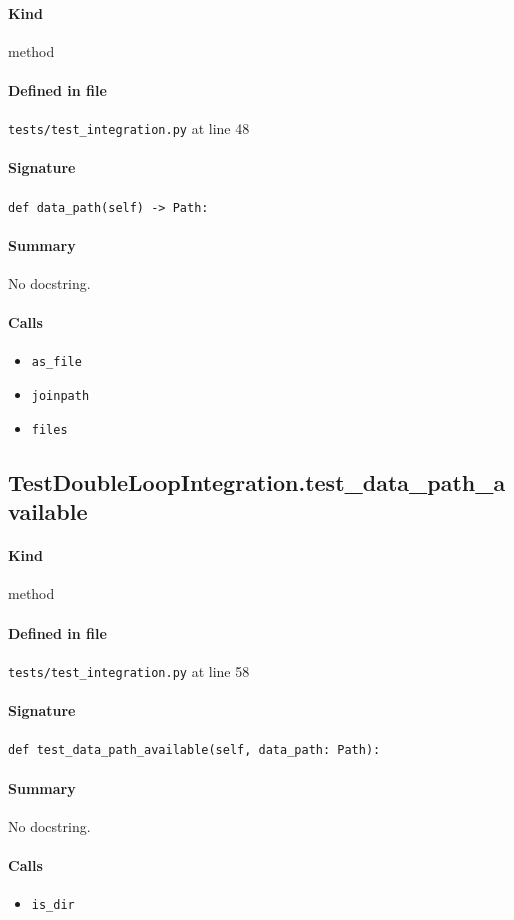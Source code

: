 \documentclass[11pt]{report}
\begin{document}
\paragraph{Kind} method
\paragraph{Defined in file} \texttt{tests/test\_integration.py} at line 48
\paragraph{Signature} \texttt{def data\_path(self) -> Path:}
\paragraph{Summary} No docstring.
\paragraph{Calls}
\begin{itemize}[leftmargin=*]
  \item \texttt{as\_file}
  \item \texttt{joinpath}
  \item \texttt{files}
\end{itemize}
\subsection{TestDoubleLoopIntegration.test\_data\_path\_available}
\label{def:tests-test_integration.py:TestDoubleLoopIntegration.test_data_path_available:L58}
\paragraph{Kind} method
\paragraph{Defined in file} \texttt{tests/test\_integration.py} at line 58
\paragraph{Signature} \texttt{def test\_data\_path\_available(self, data\_path: Path):}
\paragraph{Summary} No docstring.
\paragraph{Calls}
\begin{itemize}[leftmargin=*]
  \item \texttt{is\_dir}
\end{itemize}
\end{document}
